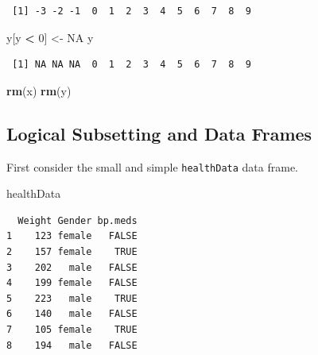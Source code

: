 \documentclass[
]{krantz}
\makeatletter
\newenvironment{Shaded}{\begin{snugshade}}{\end{snugshade}}
\newcommand{\DecValTok}[1]{\textcolor[rgb]{0.06,0.06,0.06}{#1}}
\newcommand{\KeywordTok}[1]{\textcolor[rgb]{0.27,0.27,0.27}{\textbf{#1}}}
\newcommand{\NormalTok}[1]{#1}
\newcommand{\OperatorTok}[1]{\textcolor[rgb]{0.43,0.43,0.43}{\textbf{#1}}}
\newcommand{\OtherTok}[1]{\textcolor[rgb]{0.37,0.37,0.37}{#1}}
\newcommand{\StringTok}[1]{\textcolor[rgb]{0.5,0.5,0.5}{#1}}
\newenvironment{kframe}{%
\medskip{}
\setlength{\fboxsep}{.8em}
 \def\at@end@of@kframe{}%
 \ifinner\ifhmode%
  \def\at@end@of@kframe{\end{minipage}}%
  \begin{minipage}{\columnwidth}%
 \fi\fi%
 \def\FrameCommand##1{\hskip\@totalleftmargin \hskip-\fboxsep
 \colorbox{shadecolor}{##1}\hskip-\fboxsep
     \hskip-\linewidth \hskip-\@totalleftmargin \hskip\columnwidth}%
 \MakeFramed {\advance\hsize-\width
   \@totalleftmargin\z@ \linewidth\hsize
   \@setminipage}}%
 {\par\unskip\endMakeFramed%
 \at@end@of@kframe}
\renewenvironment{Shaded}{\begin{kframe}}{\end{kframe}}
\makeatother
\begin{document}
\begin{verbatim}
 [1] -3 -2 -1  0  1  2  3  4  5  6  7  8  9
\end{verbatim}

\begin{Shaded}
\begin{Highlighting}[]
\NormalTok{y[y }\OperatorTok{\textless{}}\StringTok{ }\DecValTok{0}\NormalTok{] \textless{}{-}}\StringTok{ }\OtherTok{NA}
\NormalTok{y}
\end{Highlighting}
\end{Shaded}

\begin{verbatim}
 [1] NA NA NA  0  1  2  3  4  5  6  7  8  9
\end{verbatim}

\begin{Shaded}
\begin{Highlighting}[]
\KeywordTok{rm}\NormalTok{(x)}
\KeywordTok{rm}\NormalTok{(y)}
\end{Highlighting}
\end{Shaded}

\hypertarget{logical-subsetting-and-data-frames}{%
\subsection{Logical Subsetting and Data Frames}\label{logical-subsetting-and-data-frames}}

First consider the small and simple \texttt{healthData} data frame.

\begin{Shaded}
\begin{Highlighting}[]
\NormalTok{healthData}
\end{Highlighting}
\end{Shaded}

\begin{verbatim}
  Weight Gender bp.meds
1    123 female   FALSE
2    157 female    TRUE
3    202   male   FALSE
4    199 female   FALSE
5    223   male    TRUE
6    140   male   FALSE
7    105 female    TRUE
8    194   male   FALSE
\end{verbatim}

\begin{Shaded}
\end{Shaded}
\end{document}
